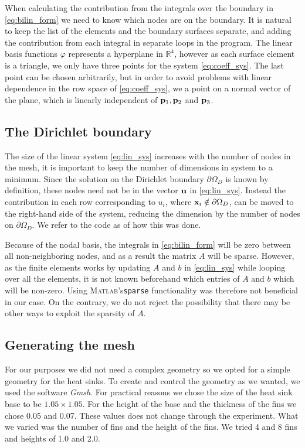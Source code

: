When calculating the contribution from the integrals over the boundary in \eqref{eq:bilin_form} we need to know which nodes are on the boundary. It is natural to keep the list of the elements and the boundary surfaces separate, and adding the contribution from each integral in separate loops in the program. The linear basis functions $\varphi$ represents a hyperplane in $\mathbb{R}^4$, however as each surface element is a triangle, we only have three points for the system \eqref{eq:coeff_sys}. The last point can be chosen arbitrarily, but in order to avoid problems with linear dependence in the row space of \eqref{eq:coeff_sys}, we a point on a normal vector of the plane, which is linearly independent of $\vb{p}_1,\vb{p}_2$ and $\vb{p}_3$.

\subsection{The Dirichlet boundary}
 The size of the linear system \eqref{eq:lin_sys} increases with the number of nodes in the mesh, it is important to keep the number of dimensions in system to a minimum. Since the solution on the Dirichlet boundary $\partial\Omega_D$ is known by definition, these nodes need not be in the vector $\vb{u}$ in \eqref{eq:lin_sys}. Instead the contribution in each row corresponding to $u_i$, where $\vb{x}_i \notin \partial\Omega_D$, can be moved to the right-hand side of the system, reducing the dimension by the number of nodes on $\partial\Omega_D$. We refer to the code as of how this was done.

 Because of the nodal basis, the integrals in \eqref{eq:bilin_form} will be zero between all non-neighboring nodes, and as a result the matrix $A$ will be sparse. However, as the finite elements works by updating $A$ and $b$ in \eqref{eq:lin_sys} while looping over all the elements, it is not known beforehand which entries of $A$ and $b$ which will be non-zero. Using \textsc{Matlab}'s\xspace \texttt{sparse} functionality was therefore not beneficial in our case. On the contrary, we do not reject the possibility that there may be other ways to exploit the sparsity of $A$.


\subsection{Generating the mesh}
 For our purposes we did not need a complex geometry so we opted for a simple geometry for the heat sinks. To create and control the geometry as we wanted, we used the software \textit{Gmsh}. For practical reasons we chose the size of the heat sink base to be $1.05\times1.05$. For the height of the base and the thickness of the fins we chose 0.05 and 0.07. These values does not change through the experiment. What we varied was the number of fins and the height of the fins. We tried 4 and 8 fins and heights of 1.0 and 2.0.

